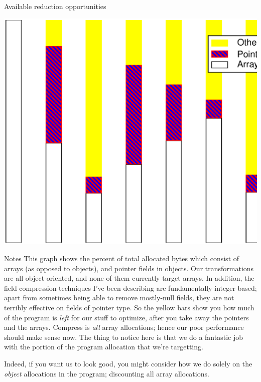 \documentclass[%
pdf,
colorBG,
slideColor,
nototal,
oqe
]{prosper}
\newenvironment{talknotes}{\begin{slide}{Notes}\tiny}{\end{slide}}
\begin{document}
\begin{slide}{Available reduction opportunities}
\begin{center}
\includegraphics[scale=0.45]{Figures/spec-space-3.eps}
\end{center}
\end{slide}

\begin{talknotes}
This graph shows the percent of total allocated bytes which consist of
arrays (as opposed to objects), and pointer fields in objects.
Our transformations are all object-oriented, and none of them
currently target arrays.  In addition, the field compression
techniques I've been describing are fundamentally integer-based;
apart from sometimes being able to remove mostly-null fields,
they are not terribly effective on fields of pointer type.  So the
yellow bars show you how much of the program is \emph{left} for our
stuff to optimize, after you take away the pointers and the arrays.
Compress is \emph{all} array allocations; hence our poor performance
should make sense now.  The thing to notice here is that we do a
fantastic job with the portion of the program allocation that we're
targetting.

Indeed, if you want us to look good, you might consider how we do
solely on the \emph{object} allocations in the program; discounting
all array allocations.
\end{talknotes}
\end{document}
